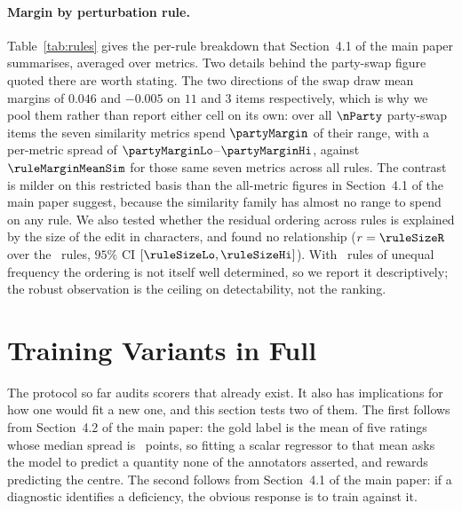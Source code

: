 \documentclass[11pt]{article}
\begin{document}
\paragraph{Margin by perturbation rule.}
Table~\ref{tab:rules} gives the per-rule breakdown that Section~4.1 of the main paper
summarises, averaged over metrics. Two details behind the party-swap figure
quoted there are worth stating. The two directions of the swap draw mean margins
of $0.046$ and $-0.005$ on $11$ and $3$ items respectively, which is why we pool
them rather than report either cell on its own: over all $\nParty$ party-swap
items the seven similarity metrics spend $\partyMargin$ of their range, with a
per-metric spread of $\partyMarginLo$--$\partyMarginHi$, against
$\ruleMarginMeanSim$ for those same seven metrics across all rules. The
contrast is milder on this restricted basis than the all-metric figures in
Section~4.1 of the main paper suggest, because the similarity family has almost no
range to spend on any rule. We also tested whether
the residual ordering across rules is explained by the size of the edit in
characters, and found no relationship ($r=\ruleSizeR$ over the \nRules\ rules,
$95\%$ CI $[\ruleSizeLo, \ruleSizeHi]$). With \nRules\ rules of unequal
frequency the ordering is not itself well determined, so we report it
descriptively; the robust observation is the ceiling on detectability, not the
ranking.

\begin{table}[t]\centering\small

\caption{\textsc{LexFlip} margin by perturbation rule, averaged over the
metrics in Table~1 of the main paper. \emph{worst metric} is the lowest margin
any single metric assigns that rule. A margin of $1$ would mean the metric
treats a legally flipped sentence exactly as it treats an unrelated one.}
\label{tab:rules}
\end{table}

\section{Training Variants in Full}
\label{app:variants}
\label{sec:objectives}

The protocol so far audits scorers that already exist. It also has implications
for how one would fit a new one, and this section tests two of them. The first
follows from Section~4.2 of the main paper: the gold label is the mean of five ratings
whose median spread is \medianRange\ points, so fitting a scalar regressor to
that mean asks the model to predict a quantity none of the annotators asserted,
and rewards predicting the centre. The second follows from
Section~4.1 of the main paper: if a diagnostic identifies a deficiency, the obvious
response is to train against it.
\end{document}

